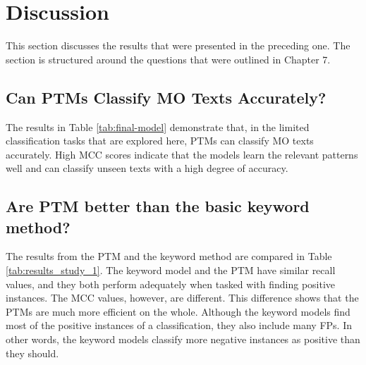 \section{Discussion} This section discusses the results that were presented in the preceding one. The section is structured around the questions that were outlined in Chapter 7.

\subsection{Can PTMs Classify MO Texts Accurately? } The results in Table \ref{tab:final-model} demonstrate that, in the limited classification tasks that are explored here, PTMs can classify MO texts accurately. High MCC scores indicate that the models learn the relevant patterns well and can classify unseen texts with a high degree of accuracy.

\subsection{Are PTM better than the basic keyword method?} The results from the PTM and the keyword method are compared in Table \ref{tab:results_study_1}. The keyword model and the PTM have similar recall values, and they both perform adequately when tasked with finding positive instances. The MCC values, however, are different. This difference shows that the PTMs are much more efficient on the whole. Although the keyword models find most of the positive instances of a classification, they also include many FPs. In other words, the keyword models classify more negative instances as positive than they should.

